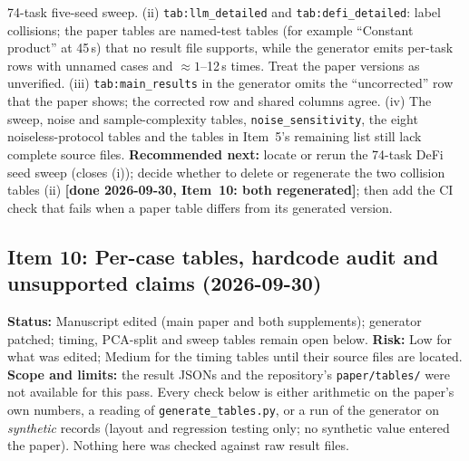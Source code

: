 \documentclass[11pt]{article}
\begin{document}
74-task five-seed sweep.
(ii) \texttt{tab:llm\_detailed} and \texttt{tab:defi\_detailed}: label collisions; the paper tables are named-test
tables (for example ``Constant product'' at 45\,s) that no result file supports, while the generator emits per-task
rows with unnamed cases and $\approx1$--12\,s times. Treat the paper versions as unverified.
(iii) \texttt{tab:main\_results} in the generator omits the ``uncorrected'' row that the paper shows; the corrected row
and shared columns agree.
(iv) The sweep, noise and sample-complexity tables, \texttt{noise\_sensitivity}, the eight noiseless-protocol tables and the
tables in Item~5's remaining list still lack complete source files.
\textbf{Recommended next:} locate or rerun the 74-task DeFi seed sweep (closes (i)); decide whether to delete or
regenerate the two collision tables (ii) \textbf{[done 2026-09-30, Item~10: both regenerated]}; then add the CI check that fails when a paper table differs from its
generated version.

\subsection*{Item 10: Per-case tables, hardcode audit and unsupported claims (2026-09-30)}
\textbf{Status:} Manuscript edited (main paper and both supplements); generator patched; timing, PCA-split and
sweep tables remain open below. \textbf{Risk:} Low for what was edited; Medium for the timing tables until their
source files are located.
\textbf{Scope and limits:} the result JSONs and the repository's \texttt{paper/tables/} were not available for this
pass. Every check below is either arithmetic on the paper's own numbers, a reading of \texttt{generate\_tables.py}, or a run
of the generator on \emph{synthetic} records (layout and regression testing only; no synthetic value entered the paper).
Nothing here was checked against raw result files.
\end{document}
